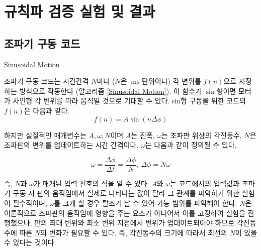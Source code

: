 \section{규칙파 검증 실험 및 결과}

\subsection{조파기 구동 코드}

\begin{algorithm}[h]
    \caption{Sinusoidal Motion}
    \label{Sinusoidal Motion}
    \begin{algorithmic}[1]
            \EndIf
        \EndFor
        \EndProcedure
    \end{algorithmic}
\end{algorithm}

조파기 구동 코드는 시간간격 $N$마다 ($N$은 $\mathrm{~ms}$ 단위이다) 각 변위를 $f(n)$으로 지정하는 방식으로 작동한다 (알고리즘 \ref{Sinusoidal Motion}). 이 함수가 $\sin$형이면 모터가 사인형 각 변위를 따라 움직일 것으로 기대할 수 있다. sin형 구동을 위한 코드의 $f(n)$은 다음과 같다.
\begin{equation}
    f(n) = A \sin(n \Delta\phi)
    \label{f(n)}
\end{equation}

하지만 실질적인 매개변수는 $A, \omega, N$이며 $A$는 진폭, $\omega$는 조파판 위상의 각진동수, $N$은 조파판의 변위를 업데이트하는 시간 간격이다. $\omega$는 다음과 같이 정의될 수 있다.

\begin{equation}
    \omega = \frac{\Delta\phi}{\Delta t} = \frac{\Delta\phi}{N}, ~\Delta\phi = N \omega
    \label{f(N)}
\end{equation}

즉, $N$과 $\omega$가 매개된 입력 신호의 식을 알 수 있다. $A$와 $\omega$는 코드에서의 입력값과 조파기 구동 시 판의 움직임에서 실제로 나타나는 값이 달라 그 관계를 파악하기 위한 실험이 필수적이며, $\omega$를 크게 할 경우 탈조가 날 수 있어 가능 범위를 파악해야 한다. $N$은 이론적으로 조파판의 움직임에 영향을 주는 요소가 아니어서 이를 고정하여 실험을 진행했으나, 판의 최대 변위와 최소 변위 지점에서 변위가 업데이트되어야 하므로 각진동수에 따른 $N$의 변화가 필요할 수 있다. 즉, 각진동수의 크기에 따라서 최선의 $N$이 있을 수 있다는 것이다.

